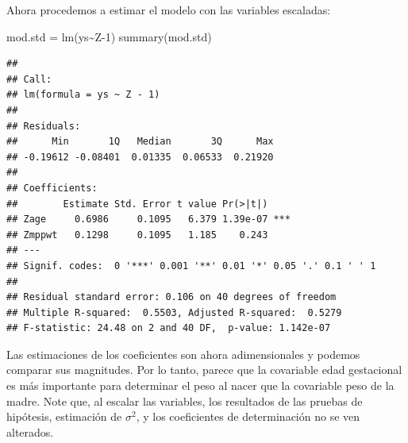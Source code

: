\documentclass[
]{article}
\newenvironment{Shaded}{\begin{snugshade}}{\end{snugshade}}
\newcommand{\ControlFlowTok}[1]{\textcolor[rgb]{0.13,0.29,0.53}{\textbf{#1}}}
\newcommand{\DecValTok}[1]{\textcolor[rgb]{0.00,0.00,0.81}{#1}}
\newcommand{\FunctionTok}[1]{\textcolor[rgb]{0.00,0.00,0.00}{#1}}
\newcommand{\NormalTok}[1]{#1}
\newcommand{\OtherTok}[1]{\textcolor[rgb]{0.56,0.35,0.01}{#1}}
\newcommand{\SpecialCharTok}[1]{\textcolor[rgb]{0.00,0.00,0.00}{#1}}
\begin{document}
\begin{Shaded}
\end{Shaded}

Ahora procedemos a estimar el modelo con las variables escaladas:

\begin{Shaded}
\begin{Highlighting}[]
\NormalTok{mod.std }\OtherTok{=} \FunctionTok{lm}\NormalTok{(ys}\SpecialCharTok{\textasciitilde{}}\NormalTok{Z}\DecValTok{{-}1}\NormalTok{)}
\FunctionTok{summary}\NormalTok{(mod.std)}
\end{Highlighting}
\end{Shaded}

\begin{verbatim}
## 
## Call:
## lm(formula = ys ~ Z - 1)
## 
## Residuals:
##      Min       1Q   Median       3Q      Max 
## -0.19612 -0.08401  0.01335  0.06533  0.21920 
## 
## Coefficients:
##        Estimate Std. Error t value Pr(>|t|)    
## Zage     0.6986     0.1095   6.379 1.39e-07 ***
## Zmppwt   0.1298     0.1095   1.185    0.243    
## ---
## Signif. codes:  0 '***' 0.001 '**' 0.01 '*' 0.05 '.' 0.1 ' ' 1
## 
## Residual standard error: 0.106 on 40 degrees of freedom
## Multiple R-squared:  0.5503, Adjusted R-squared:  0.5279 
## F-statistic: 24.48 on 2 and 40 DF,  p-value: 1.142e-07
\end{verbatim}

Las estimaciones de los coeficientes son ahora adimensionales y podemos comparar sus magnitudes. Por lo tanto, parece que la covariable edad gestacional es más importante para determinar el peso al nacer que la covariable peso de la madre. Note que, al escalar las variables, los resultados de las pruebas de hipótesis, estimación de \(\sigma^{2}\), y los coeficientes de determinación no se ven alterados.
\end{document}
